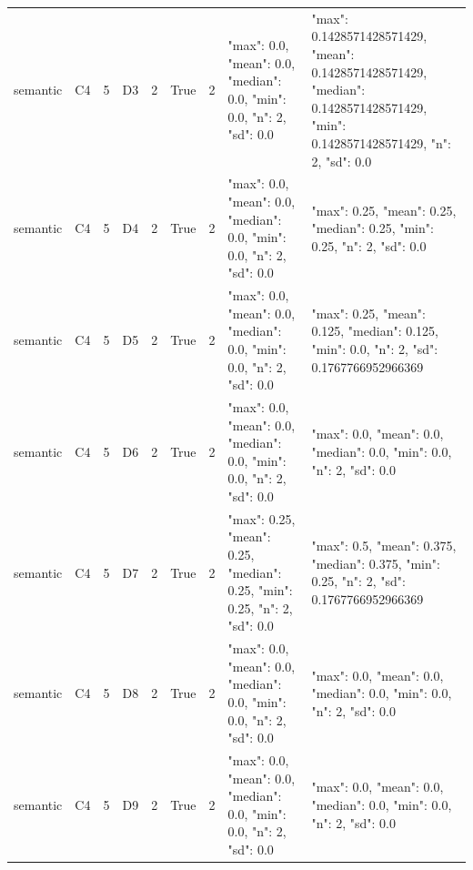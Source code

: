 \begin{tabular}{lllllllll}
semantic & C4 & 5 & D3 & 2 & True & 2 & {"max": 0.0, "mean": 0.0, "median": 0.0, "min": 0.0, "n": 2, "sd": 0.0} & {"max": 0.1428571428571429, "mean": 0.1428571428571429, "median": 0.1428571428571429, "min": 0.1428571428571429, "n": 2, "sd": 0.0} \\
semantic & C4 & 5 & D4 & 2 & True & 2 & {"max": 0.0, "mean": 0.0, "median": 0.0, "min": 0.0, "n": 2, "sd": 0.0} & {"max": 0.25, "mean": 0.25, "median": 0.25, "min": 0.25, "n": 2, "sd": 0.0} \\
semantic & C4 & 5 & D5 & 2 & True & 2 & {"max": 0.0, "mean": 0.0, "median": 0.0, "min": 0.0, "n": 2, "sd": 0.0} & {"max": 0.25, "mean": 0.125, "median": 0.125, "min": 0.0, "n": 2, "sd": 0.1767766952966369} \\
semantic & C4 & 5 & D6 & 2 & True & 2 & {"max": 0.0, "mean": 0.0, "median": 0.0, "min": 0.0, "n": 2, "sd": 0.0} & {"max": 0.0, "mean": 0.0, "median": 0.0, "min": 0.0, "n": 2, "sd": 0.0} \\
semantic & C4 & 5 & D7 & 2 & True & 2 & {"max": 0.25, "mean": 0.25, "median": 0.25, "min": 0.25, "n": 2, "sd": 0.0} & {"max": 0.5, "mean": 0.375, "median": 0.375, "min": 0.25, "n": 2, "sd": 0.1767766952966369} \\
semantic & C4 & 5 & D8 & 2 & True & 2 & {"max": 0.0, "mean": 0.0, "median": 0.0, "min": 0.0, "n": 2, "sd": 0.0} & {"max": 0.0, "mean": 0.0, "median": 0.0, "min": 0.0, "n": 2, "sd": 0.0} \\
semantic & C4 & 5 & D9 & 2 & True & 2 & {"max": 0.0, "mean": 0.0, "median": 0.0, "min": 0.0, "n": 2, "sd": 0.0} & {"max": 0.0, "mean": 0.0, "median": 0.0, "min": 0.0, "n": 2, "sd": 0.0} \\
\end{tabular}